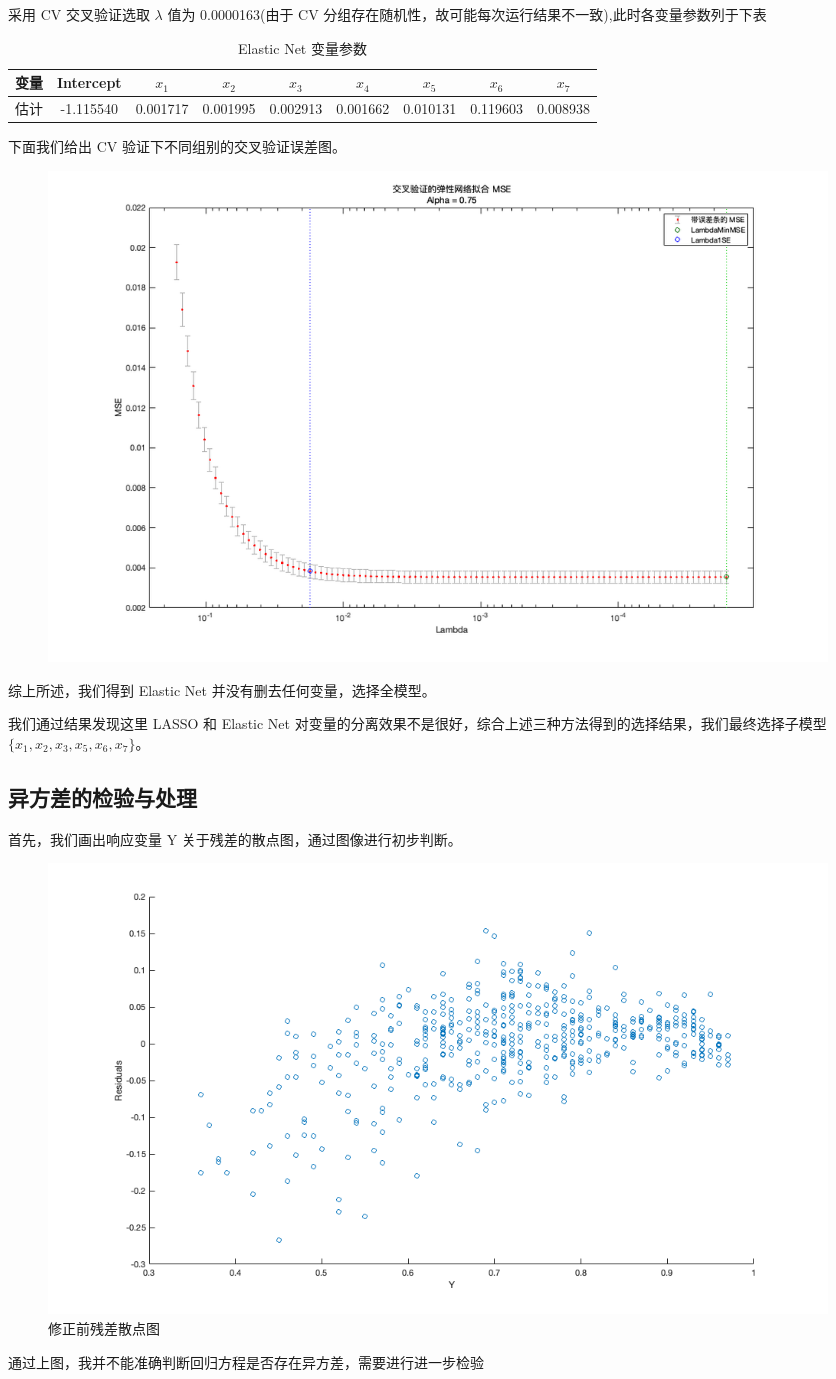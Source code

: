 \documentclass[11pt]{article}
\begin{document}
采用 CV 交叉验证选取 $\lambda$ 值为 0.0000163(由于 CV 分组存在随机性，故可能每次运行结果不一致),此时各变量参数列于下表
\begin{table}[H]
	\centering
	\caption{Elastic Net 变量参数}
	\label{tab4}
	\begin{tabular}{ccccccccc}
		\hline
		变量& Intercept& $x_1$    & $x_2$    & $x_3$& $x_4$ &   $x_5$    & $x_6$    & $x_7$ \\
		\hline
		估计	& -1.115540    &  0.001717   & 0.001995   & 0.002913    &  0.001662 &0.010131&0.119603&0.008938\\
		\hline
	\end{tabular}
\end{table}
下面我们给出 CV 验证下不同组别的交叉验证误差图。
\begin{figure}[H]
\centering
\includegraphics[scale=0.35]{images/Elastic2.png}
\end{figure}
综上所述，我们得到 Elastic Net 并没有删去任何变量，选择全模型。

我们通过结果发现这里 LASSO 和 Elastic Net 对变量的分离效果不是很好，综合上述三种方法得到的选择结果，我们最终选择子模型$\{x_1,x_2,x_3,x_5,x_6,x_7\}$。
\subsection{异方差的检验与处理}
首先，我们画出响应变量 Y 关于残差的散点图，通过图像进行初步判断。
\begin{figure}[H]
	\centering
	\caption{修正前残差散点图}
	\includegraphics[scale=0.33]{images/residuals_inital.png}
\end{figure}
通过上图，我并不能准确判断回归方程是否存在异方差，需要进行进一步检验
\end{document}
